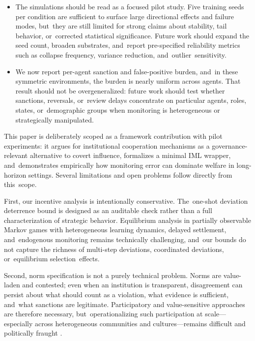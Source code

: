 \documentclass[mca,article,accept,pdftex,oneauthor]{Definitions/mdpi}
\begin{document}
\begin{itemize}
    \item The simulations should be read as a focused pilot study. Five training seeds per condition are sufficient to surface large directional effects and failure modes, but~they are still limited for strong claims about stability, tail behavior, or~corrected statistical significance. Future work should expand the seed count, broaden substrates, and~report pre-specified reliability metrics such as collapse frequency, variance reduction, and~outlier~sensitivity.

    \item We now report per-agent sanction and false-positive burden, and~in these symmetric environments, the burden is nearly uniform across agents. That result should not be overgeneralized: future work should test whether sanctions, reversals, or~review delays concentrate on particular agents, roles, states, or~demographic groups when monitoring is heterogeneous or strategically manipulated.
\end{itemize}

This paper is deliberately scoped as a framework contribution with pilot experiments: it argues for institutional cooperation mechanisms as a governance-relevant alternative to covert influence, formalizes a minimal IML wrapper, and~demonstrates empirically how monitoring error can dominate welfare in long-horizon settings. Several limitations and open problems follow directly from this~scope.

First, our incentive analysis is intentionally conservative. The~one-shot deviation deterrence bound is designed as an auditable check rather than a full characterization of strategic behavior. Equilibrium analysis in partially observable Markov games with heterogeneous learning dynamics, delayed settlement, and~endogenous monitoring remains technically challenging, and~our bounds do not capture the richness of multi-step deviations, coordinated deviations, or~equilibrium selection~effects.

Second, norm specification is not a purely technical problem. Norms are value-laden and contested; even when an institution is transparent, disagreement can persist about what should count as a violation, what evidence is sufficient, and~what sanctions are legitimate. Participatory and value-sensitive approaches are therefore necessary, but~operationalizing such participation at scale---especially across heterogeneous communities and cultures---remains difficult and politically fraught \citep{FriedmanKahnBorning2002}.
\end{document}
